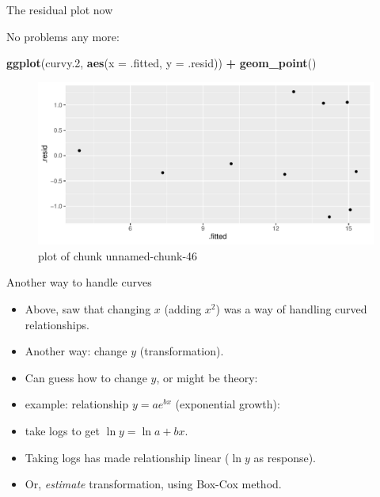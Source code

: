 \documentclass[ignorenonframetext,]{beamer}
\newenvironment{Shaded}{\begin{snugshade}}{\end{snugshade}}
\newcommand{\DataTypeTok}[1]{\textcolor[rgb]{0.13,0.29,0.53}{#1}}
\newcommand{\FloatTok}[1]{\textcolor[rgb]{0.00,0.00,0.81}{#1}}
\newcommand{\KeywordTok}[1]{\textcolor[rgb]{0.13,0.29,0.53}{\textbf{#1}}}
\newcommand{\NormalTok}[1]{#1}
\newcommand{\OperatorTok}[1]{\textcolor[rgb]{0.81,0.36,0.00}{\textbf{#1}}}
\newcommand{\StringTok}[1]{\textcolor[rgb]{0.31,0.60,0.02}{#1}}
\begin{document}
\begin{frame}[fragile]{The residual plot now}
\protect\hypertarget{the-residual-plot-now}{}

No problems any more:

\begin{Shaded}
\begin{Highlighting}[]
\KeywordTok{ggplot}\NormalTok{(curvy}\FloatTok{.2}\NormalTok{, }\KeywordTok{aes}\NormalTok{(}\DataTypeTok{x =}\NormalTok{ .fitted, }\DataTypeTok{y =}\NormalTok{ .resid)) }\OperatorTok{+}\StringTok{ }\KeywordTok{geom_point}\NormalTok{()}
\end{Highlighting}
\end{Shaded}

\begin{figure}
\centering
\includegraphics{figure/unnamed-chunk-46-1.pdf}
\caption{plot of chunk unnamed-chunk-46}
\end{figure}

\end{frame}

\begin{frame}{Another way to handle curves}
\protect\hypertarget{another-way-to-handle-curves}{}

\begin{itemize}
\item
  Above, saw that changing \(x\) (adding \(x^2\)) was a way of handling
  curved relationships.
\item
  Another way: change \(y\) (transformation).
\item
  Can guess how to change \(y\), or might be theory:
\item
  example: relationship \(y=ae^{bx}\) (exponential growth):
\item
  take logs to get \(\ln y=\ln a + bx\).
\item
  Taking logs has made relationship linear (\(\ln y\) as response).
\item
  Or, \emph{estimate} transformation, using Box-Cox method.
\end{itemize}

\end{frame}
\end{document}
